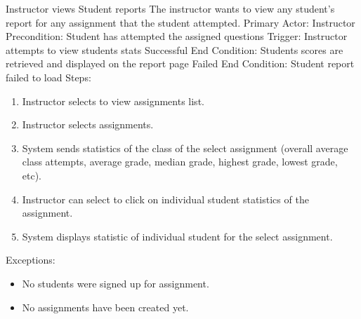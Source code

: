     \begin{section}{Instructor views Student reports}
		The instructor wants to view any student's report for any assignment that the student attempted. \newline
		Primary Actor: Instructor \newline
		Precondition: Student has attempted the assigned questions \newline
		Trigger: Instructor attempts to view students stats \newline
		Successful End Condition: Students scores are retrieved and displayed on the report page \newline
		Failed End Condition: Student report failed to load \newline
		\newline
        Steps:
        \begin{enumerate}
            \item{Instructor selects to view assignments list.}
            \item{Instructor selects assignments.}
            \item{System sends statistics of the class of the select assignment (overall average class attempts, average grade, median grade, highest grade, lowest grade, etc).}
            \item{Instructor can select to click on individual student statistics of the assignment.}
			\item{System displays statistic of individual student for the select assignment.}
        \end{enumerate}
        Exceptions:
        \begin{itemize}
            \item{No students were signed up for assignment.}
			\item{No assignments have been created yet.}
        \end{itemize}
    \end{section}	
	

	

	
	
